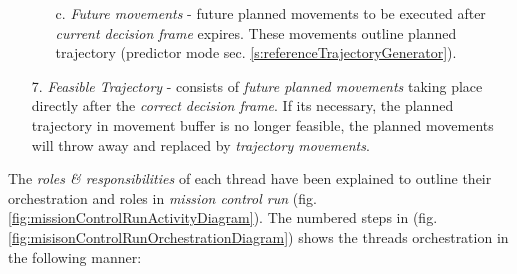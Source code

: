 \begin{itemize}
\begin{itemize}
        \item[c.] \emph{Future movements} - future planned movements to be executed after \emph{current decision frame} expires. These movements outline planned trajectory (predictor mode sec. \ref{s:referenceTrajectoryGenerator}).
    \end{itemize}
    
    \item[7.] \emph{Feasible Trajectory} - consists of \emph{future planned movements} taking place directly after the \emph{correct decision frame}. If its necessary, the planned trajectory in movement buffer is no longer feasible, the planned movements will throw away and replaced by \emph{trajectory movements}. 
\end{itemize}

\noindent The \emph{roles \& responsibilities} of each thread have been explained to outline their orchestration and roles in \emph{mission control run} (fig. \ref{fig:missionControlRunActivityDiagram}). The numbered steps in (fig. \ref{fig:misisonControlRunOrchestrationDiagram}) shows the threads orchestration in the following manner:

